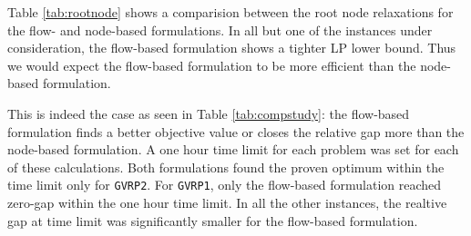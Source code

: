 \documentclass[letterpaper,12pt,onehalfspacing,twoside]{article}
\theoremstyle{msds}
\begin{document}
Table \ref{tab:rootnode} shows a comparision between the root node relaxations for the flow- and node-based formulations. In all but one of the instances under consideration, the flow-based formulation shows a tighter LP lower bound. Thus we would expect the flow-based formulation to be more efficient than the node-based formulation. 

This is indeed the case as seen in Table \ref{tab:compstudy}: the flow-based formulation finds a better objective value or closes the relative gap more than the node-based formulation. A one hour time limit for each problem was set for each of these calculations. Both formulations found the proven optimum within the time limit only for \texttt{GVRP2}. For \texttt{GVRP1}, only the flow-based formulation reached zero-gap within the one hour time limit. In all the other instances, the realtive gap at time limit was significantly smaller for the flow-based formulation.
\end{document}
